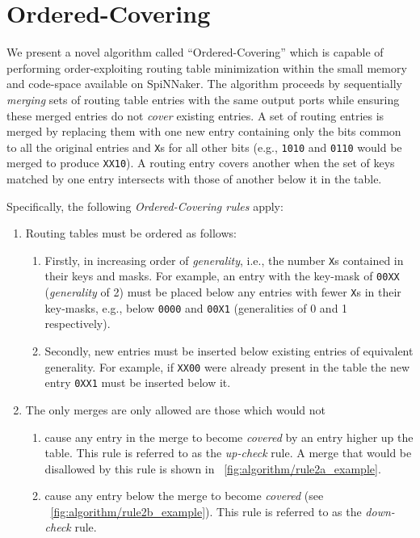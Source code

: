 \documentclass[conference]{IEEEtran}
\newcommand{\mytt}[1]{\texttt{\footnotesize#1}}
\begin{document}
\section{Ordered-Covering}

  We present a novel algorithm called ``Ordered-Covering'' which is capable of performing order-exploiting routing table minimization within the small memory and code-space available on SpiNNaker.
  The algorithm proceeds by sequentially \textit{merging} sets of routing table entries with the same output ports while ensuring these merged entries do not \textit{cover} existing entries. 
  A set of routing entries is merged by replacing them with one new entry containing only the bits common to all the original entries and \mytt{X}s for all other bits
  (e.g., \mytt{1010} and \mytt{0110} would be merged to produce \mytt{XX10}).
  A routing entry covers another when the set of keys matched by one entry intersects with those of another below it in the table.

  Specifically, the following \textit{Ordered-Covering rules} apply:

  \begin{enumerate}[\IEEEsetlabelwidth{3)}]
    \item Routing tables must be ordered as follows:
      \begin{enumerate}[\IEEEsetlabelwidth{a)}]
        \item Firstly, in increasing order of \textit{generality}, i.e., the number \mytt{X}s contained in their keys and masks.
              For example, an entry with the key-mask of \mytt{00XX} (\textit{generality} of 2) must be placed below any entries with fewer \mytt{X}s in their key-masks, e.g., below \mytt{0000} and \mytt{00X1} (generalities of 0 and 1 respectively).
        \item Secondly, new entries must be inserted below existing entries of equivalent generality.
              For example, if \mytt{XX00} were already present in the table the new entry \mytt{0XX1} must be inserted below it.
      \end{enumerate}
    \item The only merges are only allowed are those which would not
      \begin{enumerate}[\IEEEsetlabelwidth{b)}]
        \item cause any entry in the merge to become \textit{covered} by an entry higher up the table.
              This rule is referred to as the \textit{up-check} rule.
              A merge that would be disallowed by this rule is shown in \figurename~\ref{fig:algorithm/rule2a_example}.
        \item cause any entry below the merge to become \textit{covered} (see \figurename~\ref{fig:algorithm/rule2b_example}).
              This rule is referred to as the \textit{down-check} rule.
      \end{enumerate}
  \end{enumerate}
\end{document}
